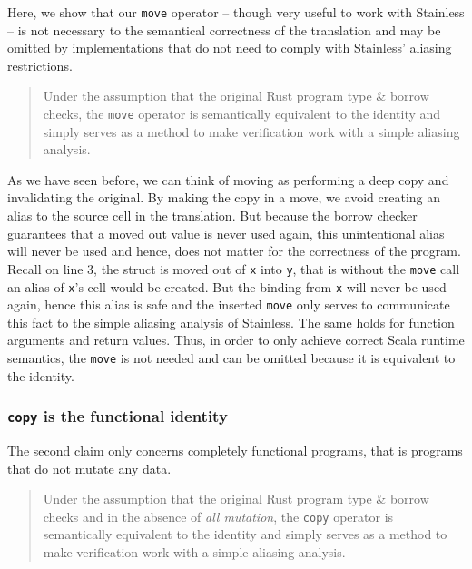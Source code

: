 Here, we show that our \passthrough{\lstinline!move!} operator --
though very useful to work with Stainless -- is not necessary to the
semantical correctness of the translation and may be omitted by implementations
that do not need to comply with Stainless' aliasing restrictions.

\begin{quote}
Under the assumption that the original Rust program type \& borrow
checks, the \passthrough{\lstinline!move!} operator is semantically
equivalent to the identity and simply serves as a method to make
verification work with a simple aliasing analysis.
\end{quote}

As we have seen before, we can think of moving as performing a deep copy and
invalidating the original. By making the copy in a move, we avoid creating an
alias to the source cell in the translation. But because the borrow checker
guarantees that a moved out value is never used again, this unintentional alias
will never be used and hence, does not matter for the correctness of the
program. Recall  on line 3, the struct is moved out of
\passthrough{\lstinline!x!} into \passthrough{\lstinline!y!}, that is without
the \passthrough{\lstinline!move!} call an alias of
\passthrough{\lstinline!x!}'s cell would be created. But the binding from
\passthrough{\lstinline!x!} will never be used again, hence this alias is safe
and the inserted \passthrough{\lstinline!move!} only serves to communicate this
fact to the simple aliasing analysis of Stainless. The same holds for function
arguments and return values. Thus, in order to only achieve correct Scala
runtime semantics, the \passthrough{\lstinline!move!} is not needed and can be
omitted because it is equivalent to the identity.

\subsubsection{\texorpdfstring{\texttt{copy} is the functional
identity}{copy is the functional identity}}

The second claim only concerns completely functional programs, that is
programs that do not mutate any data.

\begin{quote}
Under the assumption that the original Rust program type \& borrow
checks and in the absence of \emph{all mutation}, the
\passthrough{\lstinline!copy!} operator is semantically equivalent to
the identity and simply serves as a method to make verification work
with a simple aliasing analysis.
\end{quote}

